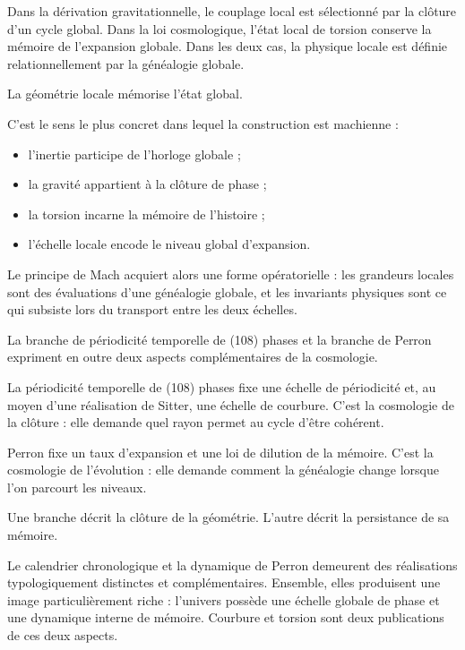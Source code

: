 Dans la dérivation gravitationnelle, le couplage local est sélectionné par la clôture d’un cycle global. Dans la loi cosmologique, l’état local de torsion conserve la mémoire de l’expansion globale. Dans les deux cas, la physique locale est définie relationnellement par la généalogie globale.\par

La géométrie locale mémorise l’état global.\par

C’est le sens le plus concret dans lequel la construction est machienne :\par

\begin{itemize}[leftmargin=*,itemsep=0.35em]
\item l’inertie participe de l’horloge globale ;
\item la gravité appartient à la clôture de phase ;
\item la torsion incarne la mémoire de l’histoire ;
\item l’échelle locale encode le niveau global d’expansion.
\end{itemize}

Le principe de Mach acquiert alors une forme opératorielle : les grandeurs locales sont des évaluations d’une généalogie globale, et les invariants physiques sont ce qui subsiste lors du transport entre les deux échelles.\par

La branche de périodicité temporelle de (108) phases et la branche de Perron expriment en outre deux aspects complémentaires de la cosmologie.\par

La périodicité temporelle de (108) phases fixe une échelle de périodicité et, au moyen d’une réalisation de Sitter, une échelle de courbure. C’est la cosmologie de la clôture : elle demande quel rayon permet au cycle d’être cohérent.\par

Perron fixe un taux d’expansion et une loi de dilution de la mémoire. C’est la cosmologie de l’évolution : elle demande comment la généalogie change lorsque l’on parcourt les niveaux.\par

Une branche décrit la clôture de la géométrie. L’autre décrit la persistance de sa mémoire.\par

Le calendrier chronologique et la dynamique de Perron demeurent des réalisations typologiquement distinctes et complémentaires. Ensemble, elles produisent une image particulièrement riche : l’univers possède une échelle globale de phase et une dynamique interne de mémoire. Courbure et torsion sont deux publications de ces deux aspects.\par

